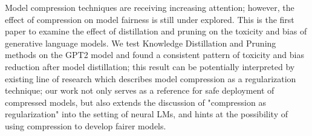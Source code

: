 Model compression techniques are receiving increasing attention; however, the effect of compression on model fairness is still under explored. This is the first paper to examine the effect of distillation and pruning on the toxicity and bias of generative language models. We test Knowledge Distillation and Pruning methods on the GPT2 model and found a consistent pattern of toxicity and bias reduction after model distillation; this result can be potentially interpreted by existing line of research which describes model compression as a regularization technique; our work not only serves as a reference for safe deployment of compressed models, but also extends the discussion of "compression as regularization" into the setting of neural LMs, and hints at the possibility of using compression to develop fairer models. 